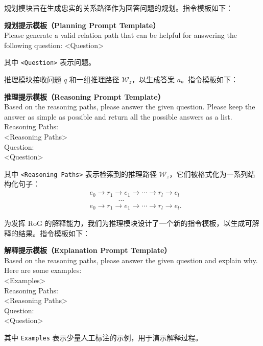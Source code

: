\documentclass[11pt,UTF8,fontset=fandol]{ctexart}
\begin{document}
规划模块旨在生成忠实的关系路径作为回答问题的规划。指令模板如下：

\begin{promptbox}
\textbf{规划提示模板（Planning Prompt Template）}\\[2pt]
Please generate a valid relation path that can be helpful for answering the following question: <Question>
\end{promptbox}

其中 \texttt{<Question>} 表示问题。

推理模块接收问题 $q$ 和一组推理路径 $\mathcal{W}_z$，以生成答案 $a$。指令模板如下：

\begin{promptbox}
\textbf{推理提示模板（Reasoning Prompt Template）}\\[2pt]
Based on the reasoning paths, please answer the given question. Please keep the answer as simple as possible and return all the possible answers as a list.\\[4pt]
Reasoning Paths:\\
<Reasoning Paths>\\[4pt]
Question:\\
<Question>
\end{promptbox}

其中 \texttt{<Reasoning Paths>} 表示检索到的推理路径 $\mathcal{W}_z$，它们被格式化为一系列结构化句子：
\[
\begin{aligned}
& e_0 \rightarrow r_1 \rightarrow e_1 \rightarrow \cdots \rightarrow r_l \rightarrow e_l \\
& \qquad\qquad \ldots \\
& e_0 \rightarrow r_1 \rightarrow e_1 \rightarrow \cdots \rightarrow r_l \rightarrow e_l.
\end{aligned}
\]

为发挥 RoG 的解释能力，我们为推理模块设计了一个新的指令模板，以生成可解释的结果。指令模板如下：

\begin{promptbox}
\textbf{解释提示模板（Explanation Prompt Template）}\\[2pt]
Based on the reasoning paths, please answer the given question and explain why.\\[4pt]
Here are some examples:\\
<Examples>\\[4pt]
Reasoning Paths:\\
<Reasoning Paths>\\[4pt]
Question:\\
<Question>
\end{promptbox}

其中 \texttt{Examples} 表示少量人工标注的示例，用于演示解释过程。
\end{document}

